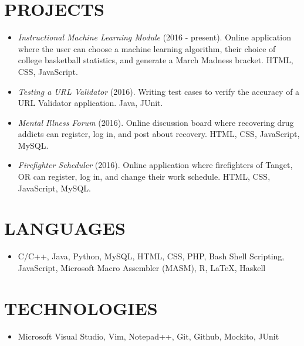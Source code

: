 \documentclass[line, margin]{res}
\begin{document}
\begin{resume}
\section{PROJECTS}
\begin{itemize}
\item \textit{Instructional Machine Learning Module} (2016 - present). Online application where the user can choose a machine learning algorithm, their choice of college basketball statistics, and generate a March Madness bracket. HTML, CSS, JavaScript.
\item \textit{Testing a URL Validator} (2016). Writing test cases to verify the accuracy of a URL Validator application. Java, JUnit.
\item \textit{Mental Illness Forum} (2016). Online discussion board where recovering drug addicts can register, log in, and post about recovery. HTML, CSS, JavaScript, MySQL.
\item \textit{Firefighter Scheduler} (2016). Online application where firefighters of Tanget, OR can register, log in, and change their work schedule. HTML, CSS, JavaScript, MySQL.
\end{itemize}

\section{LANGUAGES}
\begin{itemize}
\item C/C++, Java, Python, MySQL, HTML, CSS, PHP, Bash Shell Scripting, JavaScript, Microsoft Macro Assembler (MASM), R, LaTeX, Haskell \\
\end{itemize}

\section{TECHNOLOGIES}
\begin{itemize}
\item Microsoft Visual Studio, Vim, Notepad++, Git, Github, Mockito, JUnit \\
\end{itemize}

\end{resume}
\end{document}
